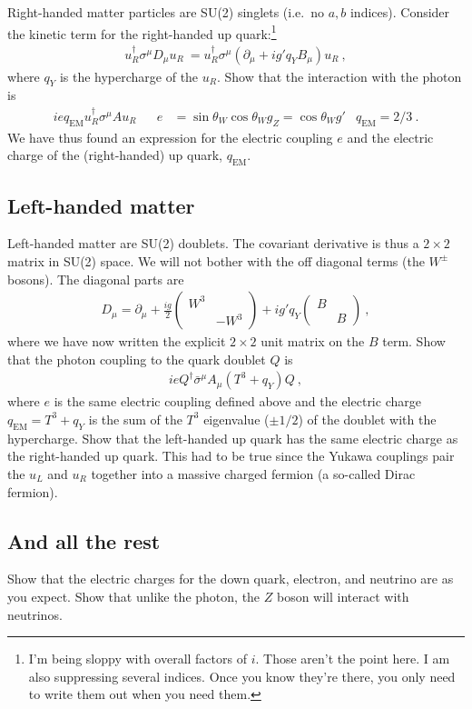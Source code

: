 \documentclass[12pt]{article}
\numberwithin{equation}{section}    %
\begin{document}
Right-handed matter particles are SU(2) singlets (i.e.\ no $a,b$ indices). Consider the kinetic term for the right-handed up quark:\footnote{I'm being sloppy with overall factors of $i$. Those aren't the point here. I am also suppressing several indices. Once you know they're there, you only need to write them out when you need them.}
\begin{align}
	u_R^\dag \sigma^\mu D_\mu u_R \ 
	= 
	u_R^\dag \sigma^\mu  \left(\partial_\mu + ig' q_Y B_\mu\right) u_R \ ,
\end{align}
where $q_Y$ is the hypercharge of the $u_R$. Show that the interaction with the photon is
\begin{align}
	i e q_\text{EM} u_R^\dag \sigma^\mu A u_R
	&&
	e&= \sin\theta_W \cos\theta_W g_Z = \cos\theta_W g'
	&
	q_\text{EM} = 2/3 \ .
\end{align}
We have thus found an expression for the electric coupling $e$ and the electric charge of the (right-handed) up quark, $q_\text{EM}$.



\subsection*{Left-handed matter}

Left-handed matter are SU(2) doublets. The covariant derivative is thus a $2\times 2$ matrix in SU(2) space. We will not bother with the off diagonal terms (the $W^\pm$ bosons). The diagonal parts are
\begin{align}
	D_\mu = \partial_\mu + \frac{ig}{2}
	\begin{pmatrix}
		W^3 & \\
		& -W^3
	\end{pmatrix}
	+ 
	i g' q_Y 
	\begin{pmatrix}
		B & \\
		& B
	\end{pmatrix} \ ,
\end{align}
where we have now written the explicit $2\times 2$ unit matrix on the $B$ term. Show that the photon coupling to the quark doublet $Q$ is
\begin{align}
	i e Q^\dag \bar\sigma^\mu  A_\mu (T^3 + q_Y) Q \ ,
\end{align}
where $e$ is the same electric coupling defined above and the electric charge $q_\text{EM}=T^3 + q_Y$ is the sum of the $T^3$ eigenvalue ($\pm 1/2$) of the doublet with the hypercharge. Show that the left-handed up quark has the same electric charge as the right-handed up quark. This had to be true since the Yukawa couplings pair the $u_L$ and $u_R$ together into a massive charged fermion (a so-called Dirac fermion).

\subsection*{And all the rest}

Show that the electric charges for the down quark, electron, and neutrino are as you expect. Show that unlike the photon, the $Z$ boson will interact with neutrinos.




 
\end{document}
